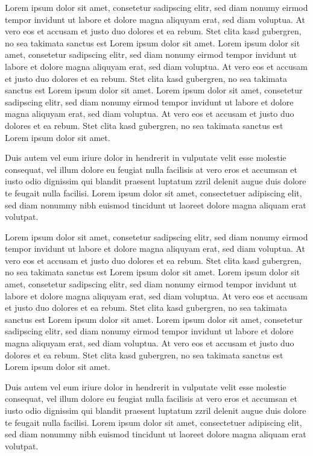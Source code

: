\documentclass[a5paper]{book}
\begin{document}
Lorem ipsum dolor sit amet, consetetur sadipscing elitr, sed diam
nonumy eirmod tempor invidunt ut labore et dolore magna aliquyam
erat,
sed diam voluptua. At vero eos et accusam et justo duo dolores et ea
rebum. Stet  clita kasd gubergren, no sea takimata sanctus
est Lorem
ipsum dolor sit amet. Lorem ipsum dolor sit amet, consetetur
sadipscing elitr, sed diam nonumy eirmod tempor invidunt ut labore
et dolore magna aliquyam erat, sed diam voluptua. At vero eos et
accusam et justo duo dolores et ea rebum. Stet clita kasd gubergren,
no sea takimata sanctus est Lorem ipsum dolor sit amet. Lorem ipsum
dolor sit amet, consetetur sadipscing elitr, sed diam nonumy eirmod
tempor invidunt ut labore et dolore magna aliquyam erat, sed diam
voluptua. At vero eos et accusam et justo duo dolores et ea rebum.
Stet clita kasd gubergren, no sea takimata sanctus est Lorem ipsum
dolor sit amet.

Duis autem vel eum iriure dolor in hendrerit in vulputate velit esse
molestie consequat, vel illum dolore eu feugiat nulla facilisis at
vero eros et accumsan et iusto odio dignissim qui blandit praesent
luptatum zzril delenit augue duis dolore te feugait nulla facilisi.
Lorem ipsum dolor sit amet, consectetuer adipiscing elit, sed diam
nonummy nibh 
euismod tincidunt ut laoreet dolore magna aliquam erat
volutpat.

Lorem ipsum dolor sit amet, consetetur sadipscing elitr, sed diam
nonumy eirmod tempor invidunt ut labore et dolore magna aliquyam
erat,
sed diam voluptua. At vero eos et accusam et justo duo dolores et ea
rebum. Stet clita kasd gubergren, no sea takimata sanctus
est Lorem
ipsum dolor sit amet. Lorem ipsum dolor sit amet, consetetur
sadipscing elitr, sed diam nonumy eirmod tempor invidunt ut labore
et dolore magna aliquyam erat, sed diam voluptua. At vero eos et
accusam et justo duo dolores et ea rebum. Stet clita kasd gubergren,
no sea takimata sanctus est Lorem ipsum dolor sit amet. Lorem ipsum
dolor sit amet, consetetur sadipscing elitr, sed diam nonumy eirmod
tempor invidunt ut labore et dolore magna aliquyam erat, sed diam
voluptua. At vero eos et accusam et justo duo dolores et ea rebum.
Stet clita kasd gubergren, no sea takimata sanctus est Lorem ipsum
dolor sit amet.

Duis autem vel eum iriure dolor in hendrerit in vulputate velit esse
molestie consequat, vel illum  dolore eu feugiat nulla facilisis at
vero eros et accumsan et iusto odio dignissim qui blandit praesent
luptatum zzril delenit augue duis dolore te feugait nulla facilisi.
Lorem ipsum dolor sit amet, consectetuer adipiscing elit, sed diam
nonummy nibh euismod tincidunt ut laoreet dolore magna aliquam erat
volutpat.
\end{document}
